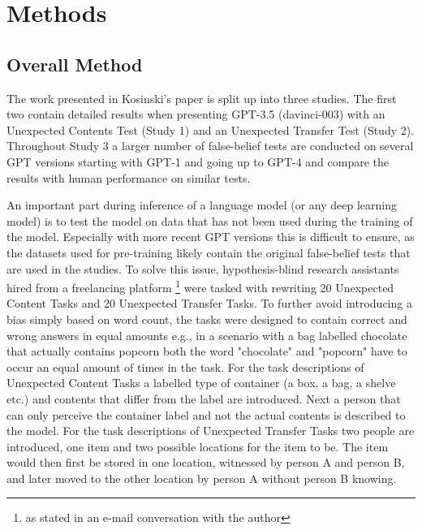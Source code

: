 \section{Methods}
\subsection{Overall Method}
The work presented in Kosinski's paper is split up into three studies. The first two contain detailed results when presenting GPT-3.5 (davinci-003) with an Unexpected Contents Test (Study 1) and an Unexpected Transfer Test (Study 2). Throughout Study 3 a larger number of false-belief tests are conducted on several GPT versions starting with GPT-1 and going up to GPT-4 and compare the results with human performance on similar tests.

An important part during inference of a language model (or any deep learning model) is to test the model on data that has not been used during the training of the model. Especially with more recent GPT versions this is difficult to ensure, as the datasets used for pre-training likely contain the original false-belief tests that are used in the studies. To solve this issue, hypothesis-blind research assistants hired from a freelancing platform \footnote{as stated in an e-mail conversation with the author} were tasked with rewriting 20 Unexpected Content Tasks and 20 Unexpected Transfer Tasks. To further avoid introducing a bias simply based on word count, the tasks were designed to contain correct and wrong answers in equal amounts e.g., in a scenario with a bag labelled chocolate that actually contains popcorn both the word "chocolate" and "popcorn" have to occur an equal amount of times in the task. For the task descriptions of Unexpected Content Tasks a labelled type of container (a box, a bag, a shelve etc.) and contents that differ from the label are introduced. Next a person that can only perceive the container label and not the actual contents is described to the model. For the task descriptions of Unexpected Transfer Tasks two people are introduced, one item and two possible locations for the item to be. The item would then first be stored in one location, witnessed by person A and person B, and later moved to the other location by person A without person B knowing.

